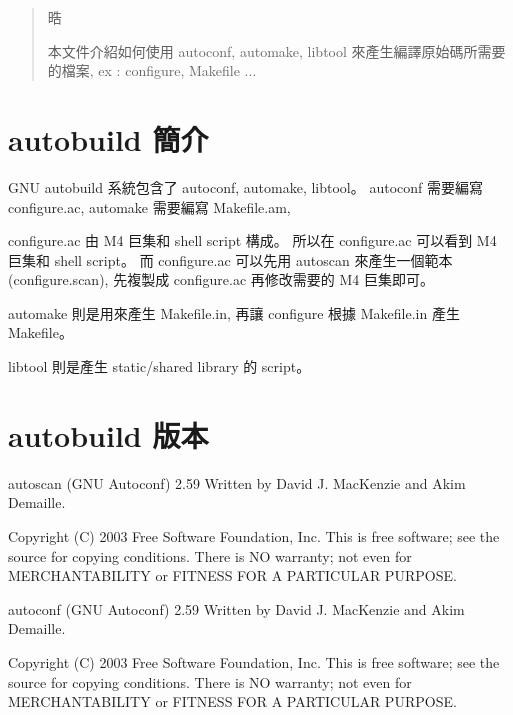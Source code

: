 \documentclass[12pt,a4]{article}
\begin{document}
\renewcommand{\abstractname}{摘要}
\renewcommand{\figurename}{圖}
\renewcommand{\contentsname}{目錄}
\begin{CJK}{UTF8}{bsmi} %



\newpage
\tableofcontents
{}
\newpage


\begin{abstract}
晧

本文件介紹如何使用 autoconf, automake, libtool
來產生編譯原始碼所需要的檔案, ex : configure, Makefile ...
\end{abstract}
\newpage

\section{autobuild 簡介}
GNU autobuild 系統包含了 autoconf, automake, libtool。
autoconf 需要編寫 configure.ac,
automake 需要編寫 Makefile.am,

configure.ac 由 M4 巨集和 shell script 構成。
所以在 configure.ac 可以看到 M4 巨集和 shell script。
而 configure.ac 可以先用 autoscan 來產生一個範本 (configure.scan),
先複製成 configure.ac 再修改需要的 M4 巨集即可。

automake 則是用來產生 Makefile.in, 再讓 configure 根據 Makefile.in
產生 Makefile。

libtool 則是產生 static/shared library 的 script。

\section{autobuild 版本}

autoscan (GNU Autoconf) 2.59
Written by David J. MacKenzie and Akim Demaille.

Copyright (C) 2003 Free Software Foundation, Inc.
This is free software; see the source for copying conditions.  There is NO
warranty; not even for MERCHANTABILITY or FITNESS FOR A PARTICULAR PURPOSE.


autoconf (GNU Autoconf) 2.59
Written by David J. MacKenzie and Akim Demaille.

Copyright (C) 2003 Free Software Foundation, Inc.
This is free software; see the source for copying conditions.  There is NO
warranty; not even for MERCHANTABILITY or FITNESS FOR A PARTICULAR PURPOSE.




\end{CJK}
\end{document}
